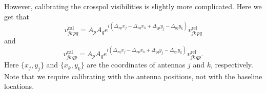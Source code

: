 \documentclass{article}
\begin{document}
However, calibrating the crosspol visibilities is slightly more complicated. Here we get that
\begin{equation}
    v_{jk \, pq}^\text{cal} = A_p A_q e^{i(\Delta_{xp} x_j - \Delta_{xq} x_k + \Delta_{yp} y_j - \Delta_{yq} y_k)} v^\text{rel}_{jk \, pq}
\end{equation}
and
\begin{equation}
    v_{jk \, qp}^\text{cal} = A_p A_q e^{i(\Delta_{xq} x_j - \Delta_{xp} x_k + \Delta_{yq} y_j - \Delta_{yp} y_k)} v^\text{rel}_{jk \, qp}.
\end{equation}
Here $\{x_j, y_j\}$ and $\{x_k, y_k\}$ are the coordinates of antennas $j$ and $k$, respectively. Note that we require calibrating with the antenna positions, not with the baseline locations.
\end{document}
